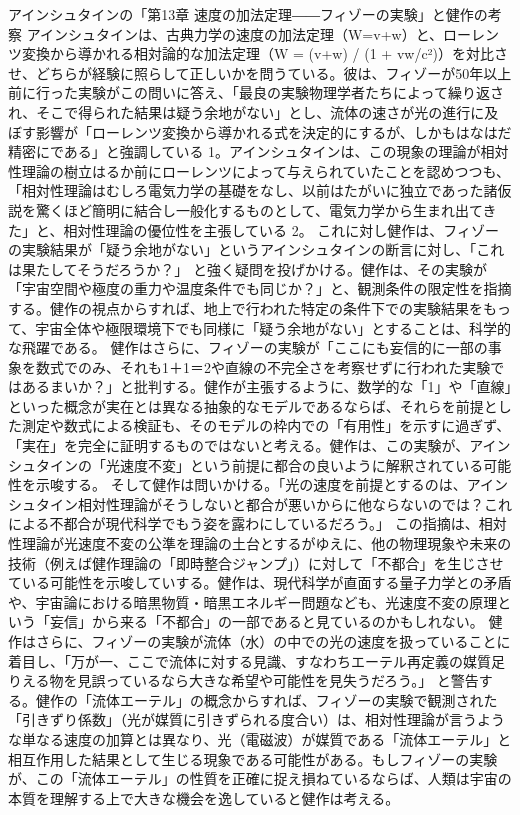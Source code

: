\documentclass{article}
\begin{document}
アインシュタインの「第13章 速度の加法定理――フィゾーの実験」と健作の考察
アインシュタインは、古典力学の速度の加法定理（W=v+w）と、ローレンツ変換から導かれる相対論的な加法定理（W = (v+w) / (1 + vw/c²)）を対比させ、どちらが経験に照らして正しいかを問うている。彼は、フィゾーが50年以上前に行った実験がこの問いに答え、「最良の実験物理学者たちによって繰り返され、そこで得られた結果は疑う余地がない」とし、流体の速さが光の進行に及ぼす影響が「ローレンツ変換から導かれる式を決定的にするが、しかもはなはだ精密にである」と強調している 1。アインシュタインは、この現象の理論が相対性理論の樹立はるか前にローレンツによって与えられていたことを認めつつも、「相対性理論はむしろ電気力学の基礎をなし、以前はたがいに独立であった諸仮説を驚くほど簡明に結合し一般化するものとして、電気力学から生まれ出てきた」と、相対性理論の優位性を主張している 2。
これに対し健作は、フィゾーの実験結果が「疑う余地がない」というアインシュタインの断言に対し、「これは果たしてそうだろうか？」 と強く疑問を投げかける。健作は、その実験が「宇宙空間や極度の重力や温度条件でも同じか？」と、観測条件の限定性を指摘する。健作の視点からすれば、地上で行われた特定の条件下での実験結果をもって、宇宙全体や極限環境下でも同様に「疑う余地がない」とすることは、科学的な飛躍である。
健作はさらに、フィゾーの実験が「ここにも妄信的に一部の事象を数式でのみ、それも1＋1＝2や直線の不完全さを考察せずに行われた実験ではあるまいか？」と批判する。健作が主張するように、数学的な「1」や「直線」といった概念が実在とは異なる抽象的なモデルであるならば、それらを前提とした測定や数式による検証も、そのモデルの枠内での「有用性」を示すに過ぎず、「実在」を完全に証明するものではないと考える。健作は、この実験が、アインシュタインの「光速度不変」という前提に都合の良いように解釈されている可能性を示唆する。
そして健作は問いかける。「光の速度を前提とするのは、アインシュタイン相対性理論がそうしないと都合が悪いからに他ならないのでは？これによる不都合が現代科学でもう姿を露わにしているだろう。」 この指摘は、相対性理論が光速度不変の公準を理論の土台とするがゆえに、他の物理現象や未来の技術（例えば健作理論の「即時整合ジャンプ」）に対して「不都合」を生じさせている可能性を示唆していする。健作は、現代科学が直面する量子力学との矛盾や、宇宙論における暗黒物質・暗黒エネルギー問題なども、光速度不変の原理という「妄信」から来る「不都合」の一部であると見ているのかもしれない。
健作はさらに、フィゾーの実験が流体（水）の中での光の速度を扱っていることに着目し、「万が一、ここで流体に対する見識、すなわちエーテル再定義の媒質足りえる物を見誤っているなら大きな希望や可能性を見失うだろう。」 と警告する。健作の「流体エーテル」の概念からすれば、フィゾーの実験で観測された「引きずり係数」（光が媒質に引きずられる度合い）は、相対性理論が言うような単なる速度の加算とは異なり、光（電磁波）が媒質である「流体エーテル」と相互作用した結果として生じる現象である可能性がある。もしフィゾーの実験が、この「流体エーテル」の性質を正確に捉え損ねているならば、人類は宇宙の本質を理解する上で大きな機会を逸していると健作は考える。
\end{document}
